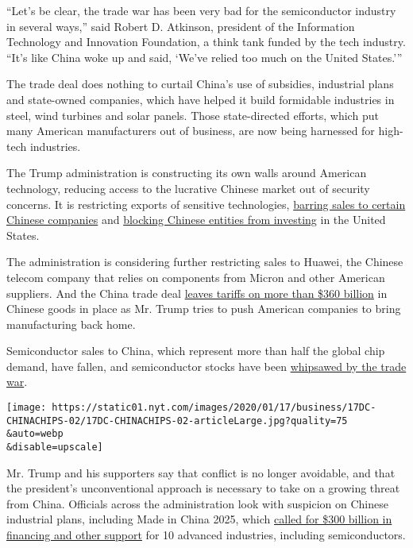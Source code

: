 ``Let's be clear, the trade war has been very bad for the semiconductor
industry in several ways,'' said Robert D. Atkinson, president of the
Information Technology and Innovation Foundation, a think tank funded by
the tech industry. ``It's like China woke up and said, `We've relied too
much on the United States.'''

The trade deal does nothing to curtail China's use of subsidies,
industrial plans and state-owned companies, which have helped it build
formidable industries in steel, wind turbines and solar panels. Those
state-directed efforts, which put many American manufacturers out of
business, are now being harnessed for high-tech industries.

The Trump administration is constructing its own walls around American
technology, reducing access to the lucrative Chinese market out of
security concerns. It is restricting exports of sensitive technologies,
\href{https://www.nytimes.com/2019/10/07/us/politics/us-to-blacklist-28-chinese-entities-over-abuses-in-xinjiang.html}{barring
sales to certain Chinese companies} and
\href{https://www.nytimes.com/2019/07/21/us/politics/china-investment-trade-war.html}{blocking
Chinese entities from investing} in the United States.

The administration is considering further restricting sales to Huawei,
the Chinese telecom company that relies on components from Micron and
other American suppliers. And the China trade deal
\href{https://www.nytimes.com/2019/12/15/business/economy/us-china-trade-deal.html}{leaves
tariffs on more than \$360 billion} in Chinese goods in place as Mr.
Trump tries to push American companies to bring manufacturing back home.

Semiconductor sales to China, which represent more than half the global
chip demand, have fallen, and semiconductor stocks have been
\href{https://www.nytimes.com/2019/05/23/business/dealbook/semiconductor-stocks-trade-war.html}{whipsawed
by the trade war}.

\texttt{[image: https://static01.nyt.com/images/2020/01/17/business/17DC-CHINACHIPS-02/17DC-CHINACHIPS-02-articleLarge.jpg?quality=75\\\&auto=webp\\\&disable=upscale]}

Mr. Trump and his supporters say that conflict is no longer avoidable,
and that the president's unconventional approach is necessary to take on
a growing threat from China. Officials across the administration look
with suspicion on Chinese industrial plans, including Made in China
2025, which
\href{https://www.nytimes.com/2017/03/07/business/china-trade-manufacturing-europe.html}{called
for \$300 billion in financing and other support} for 10 advanced
industries, including semiconductors.


